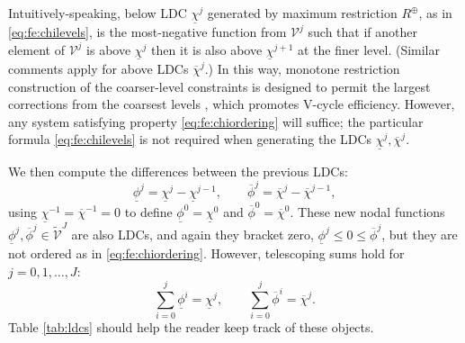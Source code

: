 \documentclass[letterpaper,final,12pt,reqno]{amsart}
\theoremstyle{cstyle}
\theoremstyle{cstyle*}
\theoremstyle{dstyle}
\numberwithin{equation}{section}
\numberwithin{figure}{section}
\numberwithin{table}{section}
\numberwithin{theorem}{section}
\newcommand{\maxR}{R^{\bm{\oplus}}}
\begin{document}
Intuitively-speaking, below LDC $\underline{\chi}^j$ generated by maximum restriction $\maxR$, as in \eqref{eq:fe:chilevels}, is the most-negative function from $\mathcal{V}^j$ such that if another element of $\mathcal{V}^j$ is above $\underline{\chi}^j$ then it is also above $\underline{\chi}^{j+1}$ at the finer level.  (Similar comments apply for above LDCs $\overline{\chi}^{j}$.)  In this way, monotone restriction construction of the coarser-level constraints is designed to permit the largest corrections from the coarsest levels \cite{GraeserKornhuber2009}, which promotes V-cycle efficiency.  However, any system satisfying property \eqref{eq:fe:chiordering} will suffice; the particular formula \eqref{eq:fe:chilevels} is not required when generating the LDCs $\underline{\chi}^{j},\overline{\chi}^{j}$.

We then compute the differences between the previous LDCs:
\begin{equation}
\underline{\phi}^j = \underline{\chi}^j - \underline{\chi}^{j-1}, \qquad \overline{\phi}^j = \overline{\chi}^j - \overline{\chi}^{j-1},  \label{eq:fe:philevels}
\end{equation}
using $\underline{\chi}^{-1}=\overline{\chi}^{-1}=0$ to define $\underline{\phi}^0=\underline{\chi}^0$ and $\overline{\phi}^0=\overline{\chi}^0$.  These new nodal functions $\underline{\phi}^{j},\overline{\phi}^{j} \in \tilde{\mathcal{V}}^J$ are also LDCs, and again they bracket zero, $\underline{\phi}^j \le 0 \le \overline{\phi}^j$, but they are not ordered as in \eqref{eq:fe:chiordering}.  However, telescoping sums hold for $j=0,1,\dots,J$:
\begin{equation}
\sum_{i=0}^j \underline{\phi}^i = \underline{\chi}^j, \qquad \sum_{i=0}^j \overline{\phi}^i = \overline{\chi}^j.  \label{eq:fe:telescoping}
\end{equation}
Table \ref{tab:ldcs} should help the reader keep track of these objects.
\end{document}
